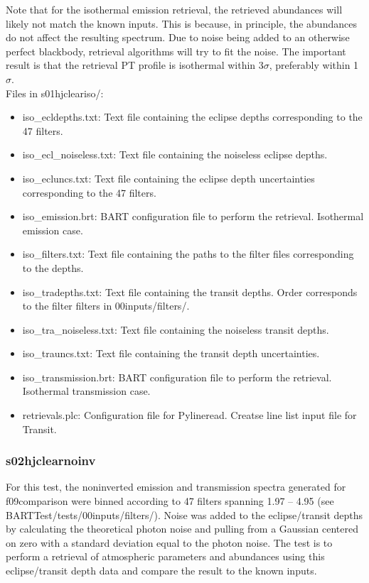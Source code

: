 \documentclass[letterpaper, 12pt]{article}
\begin{document}
Note that for the isothermal emission retrieval, the retrieved abundances will 
likely not match the known inputs. This is because, in principle, the 
abundances do not affect the resulting spectrum. Due to noise being added to 
an otherwise perfect blackbody, retrieval algorithms will try to 
fit the noise. The important result is that the retrieval PT profile is 
isothermal within 3$\sigma$, preferably within 1$\sigma$.\\

Files in s01hjcleariso/:
\begin{itemize} \itemsep0pt
  \item iso{\_}ecldepths.txt: Text file containing the eclipse depths 
        corresponding to the 47 filters.
  \item iso{\_}ecl{\_}noiseless.txt: Text file containing the noiseless eclipse depths.
  \item iso{\_}ecluncs.txt: Text file containing the eclipse depth 
        uncertainties corresponding to the 47 filters.
  \item iso{\_}emission.brt: BART configuration file to perform the retrieval. 
        Isothermal emission case.
  \item iso{\_}filters.txt: Text file containing the paths to the filter files corresponding to the depths.
  \item iso{\_}tradepths.txt: Text file containing the transit depths. Order 
        corresponds to the filter filters in 00inputs/filters/.
  \item iso{\_}tra{\_}noiseless.txt: Text file containing the noiseless transit depths.
  \item iso{\_}trauncs.txt: Text file containing the transit depth 
        uncertainties. 
  \item iso{\_}transmission.brt: BART configuration file to perform the 
        retrieval. Isothermal transmission case.
  \item retrievals.plc: Configuration file for Pylineread. Creatse line list input file for Transit.
\end{itemize}

\subsubsection{s02hjclearnoinv}
For this test, the noninverted emission and transmission spectra generated for 
f09comparison were binned according to 47 filters spanning 
1.97 -- 4.95 \microns (see BARTTest/tests/00inputs/filters/). 
Noise was added to the eclipse/transit 
depths by calculating the theoretical photon noise and pulling from a Gaussian 
centered on zero with a standard deviation equal to the photon noise. The test 
is to perform a retrieval of atmospheric parameters and abundances using this 
eclipse/transit depth data and compare the result to the known inputs.\\
\end{document}
